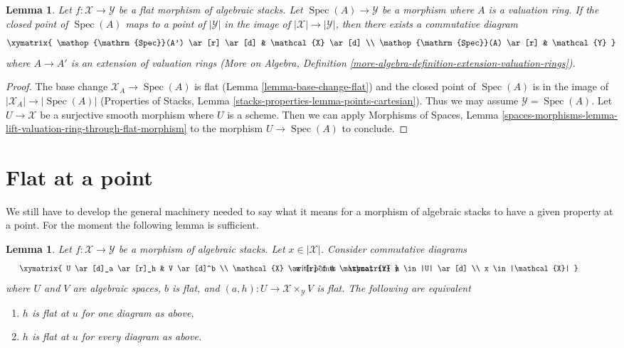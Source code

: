\documentclass{stacks-project}
\theoremstyle{plain}
\newtheorem{lemma}[subsection]{Lemma}
\theoremstyle{definition}
\theoremstyle{remark}
\numberwithin{equation}{subsection}
\def\Spec{\mathop{\mathrm{Spec}}}
\begin{document}
\begin{lemma}
\label{lemma-lift-valuation-ring-through-flat-morphism}
Let $f : \mathcal{X} \to \mathcal{Y}$ be a flat morphism
of algebraic stacks. Let $\Spec(A) \to \mathcal{Y}$ be a morphism
where $A$ is a valuation ring. If the closed point of $\Spec(A)$ maps to a
point of $|\mathcal{Y}|$ in the image of $|\mathcal{X|} \to |\mathcal{Y}|$,
then there exists a commutative diagram
$$
\xymatrix{
\Spec(A') \ar[r] \ar[d] & \mathcal{X} \ar[d] \\
\Spec(A) \ar[r] & \mathcal{Y}
}
$$
where $A \to A'$ is an extension of valuation rings
(More on Algebra, Definition
\ref{more-algebra-definition-extension-valuation-rings}).
\end{lemma}

\begin{proof}
The base change $\mathcal{X}_A \to \Spec(A)$ is flat
(Lemma \ref{lemma-base-change-flat}) and the closed point of
$\Spec(A)$ is in the image of $|\mathcal{X}_A| \to |\Spec(A)|$
(Properties of Stacks, Lemma \ref{stacks-properties-lemma-points-cartesian}).
Thus we may assume $\mathcal{Y} = \Spec(A)$. Let $U \to \mathcal{X}$
be a surjective smooth morphism where $U$ is a scheme.
Then we can apply Morphisms of Spaces, Lemma
\ref{spaces-morphisms-lemma-lift-valuation-ring-through-flat-morphism}
to the morphism $U \to \Spec(A)$ to conclude.
\end{proof}







\section{Flat at a point}
\label{section-flat-at-point}

\noindent
We still have to develop the general machinery needed to say what
it means for a morphism of algebraic stacks to have a given property
at a point. For the moment the following lemma is sufficient.

\begin{lemma}
\label{lemma-flat-at-point}
Let $f : \mathcal{X} \to \mathcal{Y}$ be a morphism of algebraic stacks.
Let $x \in |\mathcal{X}|$. Consider commutative diagrams
$$
\vcenter{
\xymatrix{
U \ar[d]_a \ar[r]_h & V \ar[d]^b \\
\mathcal{X} \ar[r]^f & \mathcal{Y}
}
}
\quad\text{with points}
\vcenter{
\xymatrix{
u \in |U| \ar[d] \\
x \in |\mathcal{X}|
}
}
$$
where $U$ and $V$ are algebraic spaces, $b$ is flat, and
$(a, h) : U \to \mathcal{X} \times_\mathcal{Y} V$
is flat. The following are equivalent
\begin{enumerate}
\item $h$ is flat at $u$ for one diagram as above,
\item $h$ is flat at $u$ for every diagram as above.
\end{enumerate}
\end{lemma}
\end{document}
